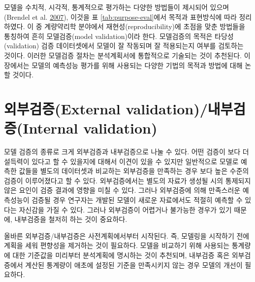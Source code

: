 \documentclass[
  11pt,
  krantz2,
  a4paper]{krantz}
\theoremstyle{definition}
\theoremstyle{definition}
\theoremstyle{definition}
\theoremstyle{remark}
\begin{document}
모델을 수치적, 시각적, 통계적으로 평가하는 다양한 방법들이 제시되어 있으며 (Brendel et al. \protect\hyperlink{ref-pmid17328581}{2007}), 이것을 표 \ref{tab:purpose-eval}에서 목적과 표현방식에 따라 정리하였다. 이 중 계량약리학 분야에서 재현성(reproducibility)에 초점을 맞춘 방법들을 통칭하여 흔히 모델검증(model validation)이라 한다. 모델검증의 목적은 타당성(validation) 검증 데이터셋에서 모델이 잘 작동되며 잘 적용되는지 여부를 검토하는 것이다. 이러한 모델검증 절차는 분석계획서에 통합적으로 기술되는 것이 추천된다. 이 장에서는 모델의 예측성능 평가를 위해 사용되는 다양한 기법의 목적과 방법에 대해 논할 것이다.

\hypertarget{uxc678uxbd80uxac80uxc99dexternal-validationuxb0b4uxbd80uxac80uxc99dinternal-validation}{%
\section{외부검증(External validation)/내부검증(Internal validation)}\label{uxc678uxbd80uxac80uxc99dexternal-validationuxb0b4uxbd80uxac80uxc99dinternal-validation}}


모델 검증의 종류로 크게 외부검증과 내부검증으로 나눌 수 있다. 어떤 검증이 보다 더 설득력이 있다고 할 수 있을지에 대해서 이견이 있을 수 있지만 일반적으로 모델로 예측한 값들을 별도의 데이터셋과 비교하는 외부검증을 만족하는 경우 보다 높은 수준의 검증이 이루어졌다고 할 수 있다. 외부검증에서는 별도의 자료가 생성될 시의 통제되지 않은 요인이 검증 결과에 영향을 미칠 수 있다. 그러나 외부검증에 의해 만족스러운 예측성능이 검증될 경우 연구자는 개발된 모델이 새로운 자료에서도 적절히 예측할 수 있다는 자신감을 가질 수 있다. 그러나 외부검증이 어렵거나 불가능한 경우가 있기 때문에, 내부검증을 철저히 하는 것이 중요하다.

올바른 외부검증/내부검증은 사전계획에서부터 시작된다. 즉, 모델링을 시작하기 전에 계획을 세워 편향성을 제거하는 것이 필요하다. 모델을 비교하기 위해 사용되는 통계량에 대한 기준값을 미리부터 분석계획에 명시하는 것이 추천되며, 내부검증 혹은 외부검증에서 계산된 통계량이 애초에 설정된 기준을 만족시키지 않는 경우 모델의 개선이 필요하다.
\end{document}
